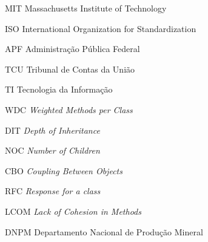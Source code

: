 \begin{siglas}
  \item[MIT] Massachusetts Institute of Technology 
 \item[ISO] International Organization for Standardization
 \item[APF] Administração Pública Federal
 \item[TCU] Tribunal de Contas da União
 \item[TI] Tecnologia da Informação
 \item[WDC] \textit{Weighted Methods per Class}
 \item[DIT] \textit{Depth of Inheritance}
 \item[NOC] \textit{Number of Children}
 \item[CBO] \textit{Coupling Between Objects}
 \item[RFC] \textit{Response for a class}
 \item[LCOM] \textit{Lack of Cohesion in Methods}
 \item [DNPM] Departamento Nacional de Produção Mineral
\end{siglas}
